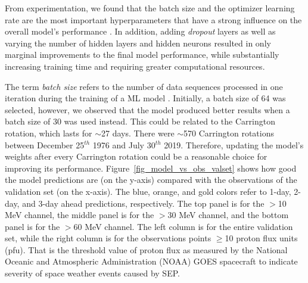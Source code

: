 From experimentation, we found that the batch size and the optimizer learning rate are the most important hyperparameters that have a strong influence on the overall model's performance \citep{greff_2016}.
In addition, adding \textit{dropout} layers as well as varying the number of hidden layers and hidden neurons resulted in only marginal improvements to the final model performance, while substantially increasing training time and requiring greater computational resources.

The term \textit{batch size} refers to the number of data sequences processed in one iteration during the training of a ML model \citep{goodfellow_2016}. Initially, a batch size of 64 was selected, however, we observed that the model produced better results when a batch size of 30 was used instead. This could be related to the Carrington rotation, which lasts for $\sim$27 days. There were $\sim$570 Carrington rotations between December 25$^{th}$ 1976 and July 30$^{th}$ 2019. Therefore, updating the model's weights after every Carrington rotation could be a reasonable choice for improving its performance.
Figure~\ref{fig_model_vs_obs_valset} shows how good the model predictions are (on the y-axis) compared with the observations of the validation set (on the x-axis). The blue, orange, and gold colors refer to 1-day, 2-day, and 3-day ahead predictions, respectively. The top panel is for the $>$10 MeV channel, the middle panel is for the $>$30 MeV channel, and the bottom panel is for the $>$60 MeV channel. The left column is for the entire validation set, while the right column is for the observations points $\geq$10 proton flux units (pfu). That is the threshold value of proton flux as measured by the National Oceanic and Atmospheric Administration (NOAA) GOES spacecraft to indicate severity of space weather events caused by SEP.

